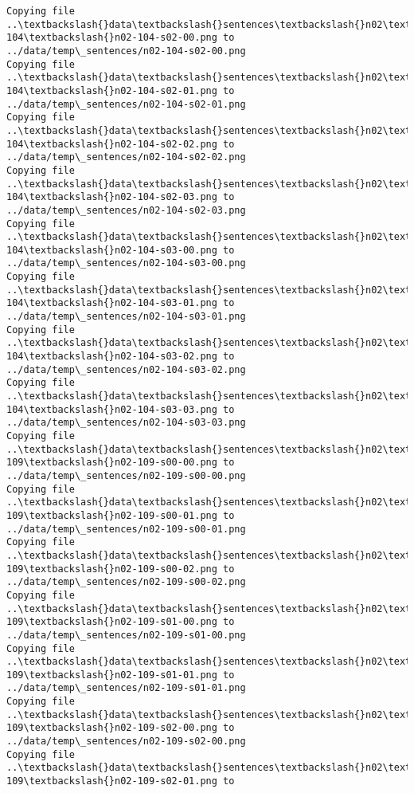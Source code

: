 \documentclass[11pt]{article}
\begin{document}
\begin{Verbatim}[commandchars=\\\{\}]
Copying file ..\textbackslash{}data\textbackslash{}sentences\textbackslash{}n02\textbackslash{}n02-104\textbackslash{}n02-104-s02-00.png to
../data/temp\_sentences/n02-104-s02-00.png
Copying file ..\textbackslash{}data\textbackslash{}sentences\textbackslash{}n02\textbackslash{}n02-104\textbackslash{}n02-104-s02-01.png to
../data/temp\_sentences/n02-104-s02-01.png
Copying file ..\textbackslash{}data\textbackslash{}sentences\textbackslash{}n02\textbackslash{}n02-104\textbackslash{}n02-104-s02-02.png to
../data/temp\_sentences/n02-104-s02-02.png
Copying file ..\textbackslash{}data\textbackslash{}sentences\textbackslash{}n02\textbackslash{}n02-104\textbackslash{}n02-104-s02-03.png to
../data/temp\_sentences/n02-104-s02-03.png
Copying file ..\textbackslash{}data\textbackslash{}sentences\textbackslash{}n02\textbackslash{}n02-104\textbackslash{}n02-104-s03-00.png to
../data/temp\_sentences/n02-104-s03-00.png
Copying file ..\textbackslash{}data\textbackslash{}sentences\textbackslash{}n02\textbackslash{}n02-104\textbackslash{}n02-104-s03-01.png to
../data/temp\_sentences/n02-104-s03-01.png
Copying file ..\textbackslash{}data\textbackslash{}sentences\textbackslash{}n02\textbackslash{}n02-104\textbackslash{}n02-104-s03-02.png to
../data/temp\_sentences/n02-104-s03-02.png
Copying file ..\textbackslash{}data\textbackslash{}sentences\textbackslash{}n02\textbackslash{}n02-104\textbackslash{}n02-104-s03-03.png to
../data/temp\_sentences/n02-104-s03-03.png
Copying file ..\textbackslash{}data\textbackslash{}sentences\textbackslash{}n02\textbackslash{}n02-109\textbackslash{}n02-109-s00-00.png to
../data/temp\_sentences/n02-109-s00-00.png
Copying file ..\textbackslash{}data\textbackslash{}sentences\textbackslash{}n02\textbackslash{}n02-109\textbackslash{}n02-109-s00-01.png to
../data/temp\_sentences/n02-109-s00-01.png
Copying file ..\textbackslash{}data\textbackslash{}sentences\textbackslash{}n02\textbackslash{}n02-109\textbackslash{}n02-109-s00-02.png to
../data/temp\_sentences/n02-109-s00-02.png
Copying file ..\textbackslash{}data\textbackslash{}sentences\textbackslash{}n02\textbackslash{}n02-109\textbackslash{}n02-109-s01-00.png to
../data/temp\_sentences/n02-109-s01-00.png
Copying file ..\textbackslash{}data\textbackslash{}sentences\textbackslash{}n02\textbackslash{}n02-109\textbackslash{}n02-109-s01-01.png to
../data/temp\_sentences/n02-109-s01-01.png
Copying file ..\textbackslash{}data\textbackslash{}sentences\textbackslash{}n02\textbackslash{}n02-109\textbackslash{}n02-109-s02-00.png to
../data/temp\_sentences/n02-109-s02-00.png
Copying file ..\textbackslash{}data\textbackslash{}sentences\textbackslash{}n02\textbackslash{}n02-109\textbackslash{}n02-109-s02-01.png to

\end{Verbatim}
\end{document}
